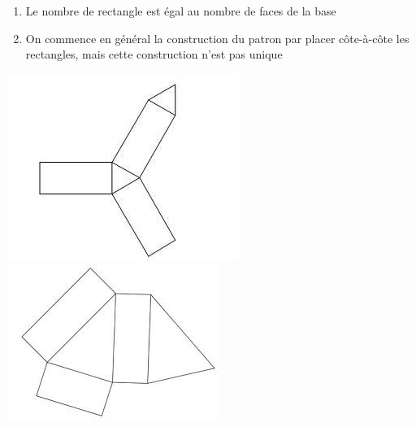 
\begin{enumerate}
\item Le nombre de rectangle est égal au nombre de faces de la base
\item On commence en général la construction du patron par placer côte-à-côte les rectangles, mais cette construction n'est pas unique
\end{enumerate}

\includegraphics[scale=0.5]{RepS-patron_prismes_eclate.jpg}
\includegraphics[scale=0.6]{RepS-patron-prismeeclate2.jpg} 
